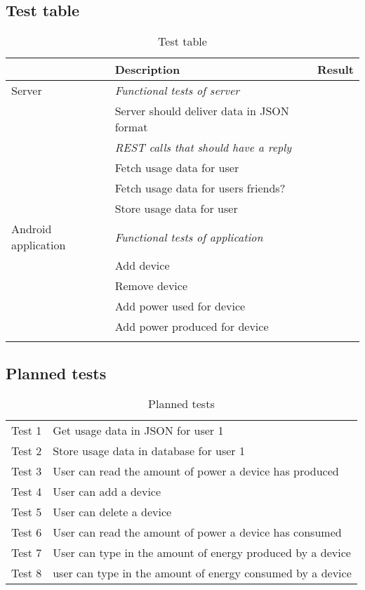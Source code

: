 \subsection{Test table}
\begin{table}[H]
\begin{tabular}{|l|l|l|}
\hline
\rowcolor{darkgray} & \textbf{Description} & \textbf{Result}\\\hline \arrayrulecolor{lightgray}
\rowcolor{lightgray} Server& \textit{Functional tests of server}&\\
\cline{1-2}\cline{2-3}
\rowcolor{lightgray}&Server should deliver data in JSON format&\\
\cline{1-2}\cline{2-3}
\rowcolor{lightgray}&\textit{REST calls that should have a reply}&\\
\cline{1-2}\cline{2-3}
\rowcolor{lightgray}&Fetch usage data for user&\\
\cline{1-2}\cline{2-3}
\rowcolor{lightgray}&Fetch usage data for users friends?&\\
\cline{1-2}\cline{2-3}\arrayrulecolor{black}
\rowcolor{lightgray}&Store usage data for user&\\\hline
\arrayrulecolor{darkgray}
\rowcolor{darkgray}Android application & \textit{Functional tests of application} &  \\ \cline{1-2}\cline{2-3}
\rowcolor{darkgray}&Add device&\\ \cline{1-2}\cline{2-3}
\rowcolor{darkgray}&Remove device&\\ \cline{1-2}\cline{2-3}
\rowcolor{darkgray}&Add power used for device&\\ \cline{1-2}\cline{2-3}
\rowcolor{darkgray}&Add power produced for device&\\\arrayrulecolor{black}
\hline
\end{tabular}
\caption{Test table}
\label{tab:testTable}
\end{table}

\subsection{Planned tests}
\begin{table}[H]
\centering
{}
\begin{tabular}{|l|l|}
\hline
Test 1&Get usage data in JSON for user 1\\
Test 2&Store usage data in database for user 1\\
Test 3&User can read the amount of power a device has produced\\
Test 4&User can add a device\\
Test 5&User can delete a device\\
Test 6&User can read the amount of power a device has consumed\\
Test 7&User can type in the amount of energy produced by a device\\
Test 8&user can type in the amount of energy consumed by a device\\
\hline
\end{tabular}
\caption{Planned tests}
\label{tab:plannedTable}
\end{table}

